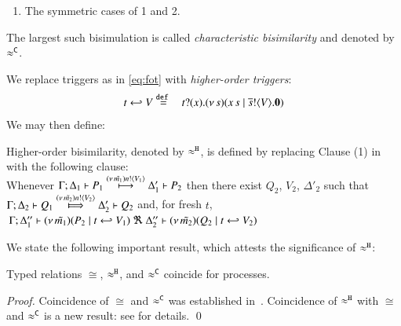 \documentclass[runningheads]{llncs}
\begin{document}
{\begin{definition}
\begin{enumerate}[1.]
		\item	The symmetric cases of 1 and 2.                
	\end{enumerate}
	The largest such bisimulation
	is called \emph{characteristic bisimilarity} {and} denoted by $\approx^\mathtt{C}$.
\end{definition}
 


We replace triggers as in \eqref{eq:fot}
with \emph{higher-order triggers}:
{\begin{eqnarray}
	t \hookleftarrow V  & \stackrel{\mathtt{def}\ }{=} &  t ? (x) . (\nu\, s)(x\, {s} \;|\; \overline{s} ! \langle V \rangle . \mathbf{0}) \label{eq:hot} 
\end{eqnarray}}
We may then define:
\begin{definition}%
	\label{d:hbw}
	Higher-order bisimilarity, denoted by $\approx^\mathtt{H}$, is defined {by} replacing 
	Clause (1) in  with the following clause:\\[1mm]
		Whenever 
	$\Gamma; \Delta_1 \vdash P_1 \stackrel{(\nu\, \tilde{m_1}) n ! \langle V_1 \rangle}{\longmapsto} \Delta_1' \vdash P_2$ %
	then there exist 
	$Q_2$, $V_2$, $\Delta'_2$
	such that \\
	$\horel{\Gamma}{\Delta_2}{Q_1}{\Hby{\news{\tilde{m_2}}\bactout{n}{V_2}}}{\Delta_2'}{Q_2}$ %
	and, for fresh $t$, \\[1mm]
	$
	\begin{array}{lrlll}
		\!\!\Gamma; \Delta''_1  \vdash  {(\nu\, \tilde{m_1})(P_2 \;|\;t \hookleftarrow V_1)}
		\ \Re\ \Delta''_2
		\vdash {(\nu\, \tilde{m_2})(Q_2 \;|\;t \hookleftarrow V_2)}
	\end{array}
	$
\end{definition}

We state the following important result, which attests the significance of $\approx^\mathtt{H}$:
\begin{theorem}\label{t:coincide}
	Typed relations $\cong$, $\approx^\mathtt{H}$, and $\approx^\mathtt{C}$ coincide for \HOp processes.
\end{theorem}
\begin{proof}
Coincidence of $\cong$ and $\approx^\mathtt{C}$ was established in~\cite{characteristic_bis}.
Coincidence of $\approx^\mathtt{H}$ with $\cong$ and $\approx^\mathtt{C}$ is a new result: see \cite{KouzapasPY15}
for details. \qed
\end{proof}

}
\end{document}
